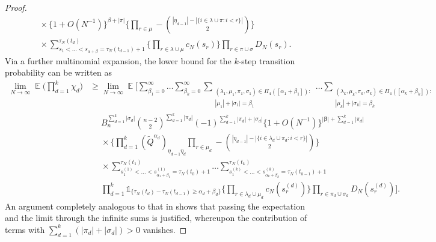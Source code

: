 \documentclass{article}
\theoremstyle{definition}
\DeclareMathOperator{\E}{\mathbb{E}}
\newcommand{\1}[1]{\mathbbm{1}_{\{#1\}}}
\begin{document}
\begin{proof}
\begin{align*}
&\phantom{\geq} \times \{ 1 + O( N^{ -1 } ) \}^{ \beta + | \pi | } \Bigg\{ \prod_{ r \in \mu } - \binom{ | \eta_{ d - 1 } | - | \{ i \in \lambda \cup \pi : i < r \} | }{ 2 } \Bigg\} \\
&\phantom{\geq} \times \sum_{ s_1 < \ldots < s_{ \alpha + \beta } = \tau_N( t_{ d - 1 } ) + 1 }^{ \tau_N( t_d ) } \Bigg\{ \prod_{ r \in \lambda \cup \mu } c_N( s_r ) \Bigg\} \prod_{ r \in \pi \cup \sigma }  D_N( s_r ) .
\end{align*}
Via a further multinomial expansion, the lower bound for the $k$-step transition probability can be written as
\begin{align*}
\lim_{ N \rightarrow \infty } \E\Bigg( \prod_{ d = 1 }^k \chi_d \Bigg) 
&\geq \lim_{ N \rightarrow \infty } \E\Bigg[ \sum_{ \beta_1 = 0 }^{ \infty } \ldots \sum_{ \beta_k = 0 }^{ \infty } \sum_{\substack{ ( \lambda_1, \mu_1, \pi_1, \sigma_1 ) \in \Pi_4( [ \alpha_1 + \beta_1 ] ):\\  | \mu_1 | + | \sigma_1 | = \beta_1 }} \ldots 
\sum_{\substack{ ( \lambda_k, \mu_k, \pi_k, \sigma_k ) \in \Pi_4( [ \alpha_k + \beta_k ] ) :\\ | \mu_k | + | \sigma_k | = \beta_k }} \\
&\phantom{\geq} B_n^{ \sum_{ d = 1 }^k | \sigma_d | } \binom{ n - 2 }{ 2 }^{ \sum_{ d = 1 }^k| \pi_d | }
( -1 )^{ \sum_{ d = 1 }^k | \pi_d | + | \sigma_d | }  \{ 1 + O( N^{ -1 } ) \}^{ | \bm{ \beta } | + \sum_{ d = 1 }^k | \pi_d | } \\
&\phantom{\geq} \times \Bigg\{ \prod_{ d = 1 }^k ( \tilde{ Q }^{ \alpha_d } )_{ \eta_{ d - 1 } \eta_d } \prod_{ r \in \mu_d } - \binom{ | \eta_{ d - 1 } | - | \{ i \in \lambda_d \cup \pi_d : i < r \} | }{ 2 } \Bigg\} \\
&\phantom{\geq} \times \sum_{ s_1^{ ( 1 ) } < \ldots < s_{ \alpha_1 + \beta_1 }^{ ( 1 ) } = \tau_N( t_0 ) + 1 }^{ \tau_N( t_1 ) } \ldots \sum_{ s_1^{ ( k ) } < \ldots < s_{ \alpha_k + \beta_k }^{ ( k ) } = \tau_N( t_{ k - 1 } ) + 1 }^{ \tau_N( t_k ) } \\
&\phantom{\geq} \prod_{ d = 1 }^k \mathds{ 1 }_{ \{ \tau_N( t_d ) - \tau_N( t_{ d - 1 } ) \geq \alpha_d + \beta_d \} } \Bigg\{ \prod_{ r \in \lambda_d \cup \mu_d } c_N( s_r^{ ( d ) } ) \Bigg\} \prod_{ r \in \pi_d \cup \sigma_d }  D_N( s_r^{ ( d ) } ) \Bigg].
\end{align*}
An argument completely analogous to that in \citet[Appendix]{koskela2018} shows that passing the expectation and the limit through the infinite sums is justified, whereupon the contribution of terms with $ \sum_{ d = 1 }^k ( | \pi_d | + | \sigma_d | ) > 0$ vanishes.

\end{proof}
\end{document}
